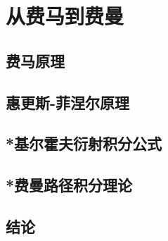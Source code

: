 

\section{从费马到费曼}\label{22-4}

\subsection{费马原理}\label{22-4-1}

\subsection{惠更斯-菲涅尔原理}\label{22-4-2}

\subsection{*基尔霍夫衍射积分公式}\label{22-4-3}

\subsection{*费曼路径积分理论}\label{22-4-4}

\subsection{结论}\label{22-4-5}